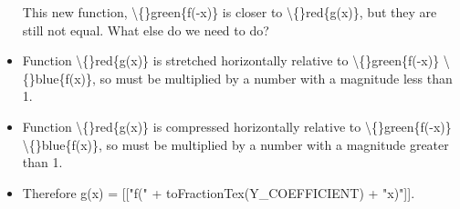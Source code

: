 \documentclass{article}
\begin{document}
\begin{itemize}
                        
                            This new function, \textbackslash\{\}green\{f(-x)\} is closer to \textbackslash\{\}red\{g(x)\}, but they are still not equal.
                            What else do we need to do?
  \item Function \textbackslash\{\}red\{g(x)\} is stretched horizontally relative to
                        \textbackslash\{\}green\{f(-x)\}
                        \textbackslash\{\}blue\{f(x)\},
                        so must be multiplied by a number with a magnitude less than 1.
  \item Function \textbackslash\{\}red\{g(x)\} is compressed horizontally relative to
                        \textbackslash\{\}green\{f(-x)\}
                        \textbackslash\{\}blue\{f(x)\},
                        so must be multiplied by a number with a magnitude greater than 1.
  \item Therefore g(x) = [["f(" + toFractionTex(Y\_COEFFICIENT) + "x)"]].
\end{itemize}
\end{document}
